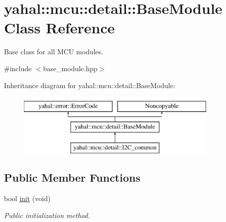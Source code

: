 \hypertarget{classyahal_1_1mcu_1_1detail_1_1_base_module}{}\section{yahal\+:\+:mcu\+:\+:detail\+:\+:Base\+Module Class Reference}
\label{classyahal_1_1mcu_1_1detail_1_1_base_module}


Base class for all M\+C\+U modules.  




{\ttfamily \#include $<$base\+\_\+module.\+hpp$>$}

Inheritance diagram for yahal\+:\+:mcu\+:\+:detail\+:\+:Base\+Module\+:\begin{figure}[H]
\begin{center}
\leavevmode
\includegraphics[height=3.000000cm]{classyahal_1_1mcu_1_1detail_1_1_base_module}
\end{center}
\end{figure}
\subsection*{Public Member Functions}
\begin{DoxyCompactItemize}
\item 
bool \hyperlink{classyahal_1_1mcu_1_1detail_1_1_base_module_aba9c940189444ede5e0c4308172ae0e6}{init} (void)
\begin{DoxyCompactList}\small\item\em Public initialization method. \end{DoxyCompactList}\end{DoxyCompactItemize}
